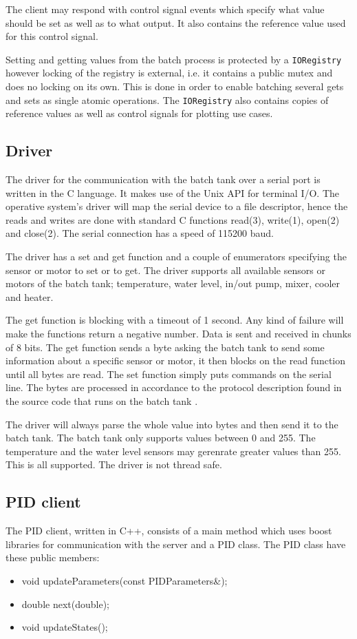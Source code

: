 \documentclass{article}
\begin{document}
The client may respond with control signal events which specify what
value should be set as well as to what output. It also contains the
reference value used for this control signal.

Setting and getting values from the batch process is protected by a
\verb+IORegistry+ however locking of the registry is external, i.e. it
contains a public mutex and does no locking on its own. This is done in
order to enable batching several gets and sets as single atomic
operations. The \verb+IORegistry+ also contains copies of reference
values as well as control signals for plotting use cases.


\subsection{Driver}
The driver for the communication with the batch tank over a serial port is written in the C language.
It makes use of the Unix API for terminal I/O. The operative system's driver will
map the serial device to a file descriptor, hence the reads and writes are done
with standard C functions read(3), write(1), open(2) and close(2).  The serial
connection has a speed of 115200 baud. 

The driver has a set and get function and a couple of enumerators specifying the
sensor or motor to set or to get. The driver supports all available sensors or motors of
the batch tank; temperature, water level, in/out pump, mixer, cooler and heater.

The get function is blocking with a timeout of 1 second. Any kind of failure will
make the functions return a negative number. Data is sent and received in chunks
of 8 bits. The get function sends a byte asking the batch tank to send some
information about a specific sensor or motor, it then blocks on the read function
until all bytes are read. The set function simply puts commands on the serial
line. The bytes are processed in accordance to the protocol description found in the source code that runs on the
batch tank \cite[line 150-223]{kokare.c}. 

The driver will always parse the whole value into bytes and then send it to the
batch tank. The batch tank only supports values between 0 and 255. The
temperature and the water level sensors may gerenrate greater values than 255.
This is all supported. The driver is not thread safe.

\subsection{PID client}
The PID client, written in C++, consists of a main method which uses boost libraries for communication with the server and a PID class. The PID class have these public members:
\begin{itemize}
\item{void updateParameters(const PIDParameters\&);}
\item{double next(double);}
\item{void updateStates();}
\end{itemize}
\end{document}
